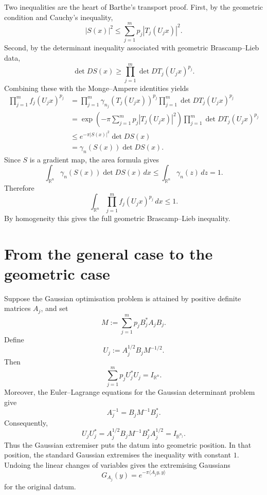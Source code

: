 \documentclass[11pt]{article}
\begin{document}
Two inequalities are the heart of Barthe's transport proof. First, by the
geometric condition and Cauchy's inequality,
\[
        |S(x)|^2
        \leq
        \sum_{j=1}^m p_j|T_j(U_jx)|^2.
\]
Second, by the determinant inequality associated with geometric
Brascamp--Lieb data,
\[
        \det DS(x)
        \geq
        \prod_{j=1}^m
        \det DT_j(U_jx)^{p_j}.
\]
Combining these with the Monge--Ampere identities yields
\[
\begin{aligned}
        \prod_{j=1}^m f_j(U_jx)^{p_j}
        &=
        \prod_{j=1}^m
        \gamma_{n_j}(T_j(U_jx))^{p_j}
        \prod_{j=1}^m
        \det DT_j(U_jx)^{p_j}    \\
        &=
        \exp\left(
        -\pi\sum_{j=1}^m p_j|T_j(U_jx)|^2
        \right)
        \prod_{j=1}^m
        \det DT_j(U_jx)^{p_j}    \\
        &\leq
        e^{-\pi |S(x)|^2}\det DS(x)                 \\
        &=
        \gamma_n(S(x))\det DS(x).
\end{aligned}
\]
Since \(S\) is a gradient map, the area formula gives
\[
        \int_{\mathbb R^n}\gamma_n(S(x))\det DS(x)\,dx
        \leq
        \int_{\mathbb R^n}\gamma_n(z)\,dz
        =
        1.
\]
Therefore
\[
        \int_{\mathbb R^n}
        \prod_{j=1}^m f_j(U_jx)^{p_j}\,dx
        \leq 1.
\]
By homogeneity this gives the full geometric Brascamp--Lieb inequality.

\section{From the general case to the geometric case}

Suppose the Gaussian optimisation problem is attained by positive definite
matrices \(A_j\), and set
\[
        M
        :=
        \sum_{j=1}^m p_jB_j^*A_jB_j.
\]
Define
\[
        U_j
        :=
        A_j^{1/2}B_jM^{-1/2}.
\]
Then
\[
        \sum_{j=1}^m p_jU_j^*U_j
        =
        I_{\mathbb R^n}.
\]
Moreover, the Euler--Lagrange equations for the Gaussian determinant problem
give
\[
        A_j^{-1}=B_jM^{-1}B_j^*.
\]
Consequently,
\[
        U_jU_j^*
        =
        A_j^{1/2}B_jM^{-1}B_j^*A_j^{1/2}
        =
        I_{\mathbb R^{n_j}}.
\]
Thus the Gaussian extremiser puts the datum into geometric position. In that
position, the standard Gaussian extremises the inequality with constant \(1\).
Undoing the linear changes of variables gives the extremising Gaussians
\[
        G_{A_j}(y)=e^{-\pi\langle A_jy,y\rangle}
\]
for the original datum.
\end{document}
